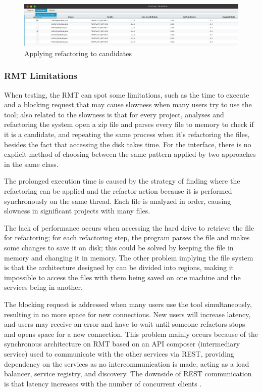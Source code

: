 \begin{figure}[ht!]
\SetCaptionWidth{\textwidth}
\caption{Applying refactoring to candidates}
\label{fig-refactor}
\includegraphics[width =\textwidth]{Chapter-2/Figures/refactor.png}
\end{figure}
\FloatBarrier

\subsubsection{RMT Limitations}
\label{subsub-limitation}
When testing, the RMT can spot some limitations, such as the time to execute and a blocking request that may cause slowness when many users try to use the tool; also related to the slowness is that for every project, analyses and refactoring the system open a zip file and parses every file to memory to check if it is a candidate, and repeating the same process when it's refactoring the files, besides the fact that accessing the disk takes time. For the interface, there is no explicit method of choosing between the same pattern applied by two approaches in the same class.

The prolonged execution time is caused by the strategy of finding where the refactoring can be applied and the refactor action because it is performed synchronously on the same thread. Each file is analyzed in order, causing slowness in significant projects with many files.

The lack of performance occurs when accessing the hard drive to retrieve the file for refactoring; for each refactoring step, the program parses the file and makes some changes to save it on disk; this could be solved by keeping the file in memory and changing it in memory.
The other problem implying the file system is that the architecture designed by \textcite{beluzzo2018abordagem} can be divided into regions, making it impossible to access the files with them being saved on one machine and the services being in another.

The blocking request is addressed when many users use the tool simultaneously, resulting in no more space for new connections. New users will increase latency, and users may receive an error and have to wait until someone refactors stops and opens space for a new connection. This problem mainly occurs because of the synchronous architecture on RMT based on an API composer (intermediary service) used to communicate with the other services via REST, providing dependency on the services as no intercommunication is made, acting as a load balancer, service registry, and discovery. The downside of REST communication is that latency increases with the number of concurrent clients \cite{Cebeci2020DesignOA}. 

